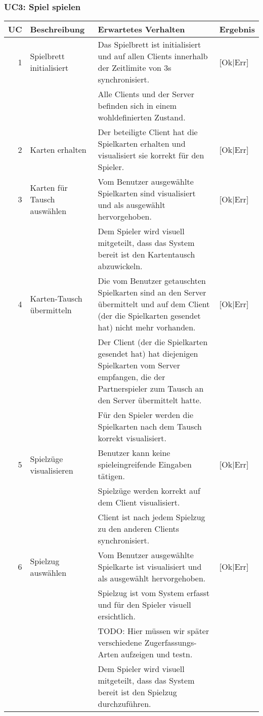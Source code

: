 \documentclass[12pt,halfparskip]{scrartcl}
\begin{document}
\subsubsection{UC3: Spiel spielen}\label{sub:uc3_spiel_spielen} %
\begin {tabular}{r | p{3cm} | p{9cm} | l}
\toprule
\textbf{UC} & \textbf{Beschreibung} & \textbf{Erwartetes Verhalten} & \textbf{Ergebnis} \\
\midrule
1 & Spielbrett initialisiert & Das Spielbrett ist initialisiert und auf allen Clients innerhalb der Zeitlimite von 3s synchronisiert. & [Ok|Err] \\
 \cline{3-4} & & Alle Clients und der Server befinden sich in einem wohldefinierten Zustand. & \\
\midrule
2 & Karten erhalten & Der beteiligte Client hat die Spielkarten erhalten und visualisiert sie korrekt für den Spieler. & [Ok|Err] \\
\midrule
3 & Karten für Tausch auswählen & Vom Benutzer ausgewählte Spielkarten sind visualisiert und als ausgewählt hervorgehoben. & [Ok|Err] \\
 \cline{3-4} & & Dem Spieler wird visuell mitgeteilt, dass das System bereit ist den Kartentausch abzuwickeln. & \\
\midrule
4 & Karten-Tausch übermitteln & Die vom Benutzer getauschten Spielkarten sind an den Server übermittelt und auf dem Client (der die Spielkarten gesendet hat) nicht mehr vorhanden. & [Ok|Err] \\
 \cline{3-4} & & Der Client (der die Spielkarten gesendet hat) hat diejenigen Spielkarten vom Server empfangen, die der Partnerspieler zum Tausch an den Server übermittelt hatte. & \\
 \cline{3-4} & & Für den Spieler werden die Spielkarten nach dem Tausch korrekt visualisiert. & \\
\midrule
5 & Spielzüge visualisieren & Benutzer kann keine spieleingreifende Eingaben tätigen. & [Ok|Err] \\
 \cline{3-4} & & Spielzüge werden korrekt auf dem Client visualisiert. & \\
 \cline{3-4} & & Client ist nach jedem Spielzug zu den anderen Clients synchronisiert. & \\
\midrule
6 & Spielzug auswählen & Vom Benutzer ausgewählte Spielkarte ist visualisiert und als ausgewählt hervorgehoben. & [Ok|Err] \\
 \cline{3-4} & & Spielzug ist vom System erfasst und für den Spieler visuell ersichtlich. & \\
 \cline{3-4} & & TODO: Hier müssen wir später verschiedene Zugerfassungs-Arten aufzeigen und testn. & \\
 \cline{3-4} & & Dem Spieler wird visuell mitgeteilt, dass das System bereit ist den Spielzug durchzuführen. & \\
\bottomrule
\end{tabular}
\end{document}
